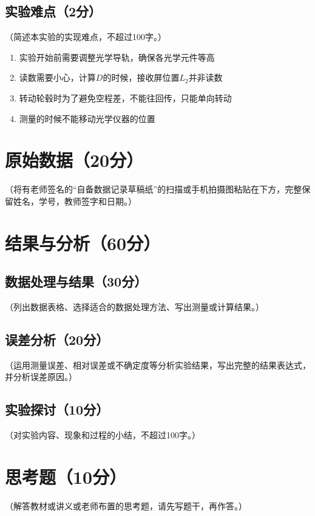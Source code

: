 \documentclass[yuxi]{../template/Report}%
\begin{document}
\subsection{实验难点（2分）}
（简述本实验的实现难点，不超过100字。）
\begin{enumerate}
    \item 实验开始前需要调整光学导轨，确保各光学元件等高
    \item 读数需要小心，计算$D$的时候，接收屏位置$L_2$并非读数
    \item 转动轮毂时为了避免空程差，不能往回传，只能单向转动
    \item 测量的时候不能移动光学仪器的位置
\end{enumerate}
\begin{fullreportonly}
\section{原始数据（20分）}
（将有老师签名的“自备数据记录草稿纸”的扫描或手机拍摄图粘贴在下方，完整保留姓名，学号，教师签字和日期。）

\section{结果与分析（60分）}
\subsection{数据处理与结果（30分）}
（列出数据表格、选择适合的数据处理方法、写出测量或计算结果。）

\subsection{误差分析（20分）}
（运用测量误差、相对误差或不确定度等分析实验结果，写出完整的结果表达式，并分析误差原因。）

\subsection{实验探讨（10分）}
（对实验内容、现象和过程的小结，不超过100字。）

\section{思考题（10分）}
（解答教材或讲义或老师布置的思考题，请先写题干，再作答。）
\end{fullreportonly}
\insertnotes
\end{document}
